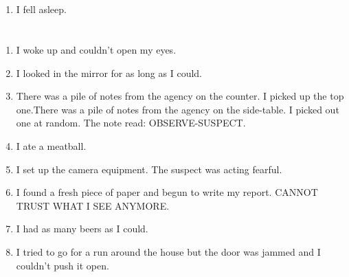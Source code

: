 \documentclass{article}
\begin{document}
    \newpage
    
    \section{}
    
    \begin{enumerate}
    
    \item I fell asleep.\\
    
    \end{enumerate}
     
    \newpage
    
    \section{}
    
    \begin{enumerate}
    
    \item I woke up and couldn't open my eyes.\\
    
    \item I looked in the mirror for as long as I could.\\
    
    \item There was a pile of notes from the agency on the counter. I picked up the top one.There was a pile of notes from the agency on the side-table. I picked out one at random. The note read: OBSERVE-SUSPECT.\\
    
    \item I ate a meatball.\\
    
    \item I set up the camera equipment. The suspect was acting fearful.\\
    
    \item I found a fresh piece of paper and begun to write my report. CANNOT TRUST WHAT I SEE ANYMORE.\\
    
    \item I had as many beers as I could.\\
    
    \item I tried to go for a run around the house but the door was jammed and I couldn't push it open.\\
    
    \end{enumerate}
     
\end{document}
